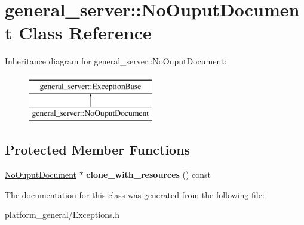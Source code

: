 \hypertarget{classgeneral__server_1_1NoOuputDocument}{\section{general\-\_\-server\-:\-:\-No\-Ouput\-Document \-Class \-Reference}
\label{classgeneral__server_1_1NoOuputDocument}
}
\-Inheritance diagram for general\-\_\-server\-:\-:\-No\-Ouput\-Document\-:\begin{figure}[H]
\begin{center}
\leavevmode
\includegraphics[height=2.000000cm]{classgeneral__server_1_1NoOuputDocument}
\end{center}
\end{figure}
\subsection*{\-Protected \-Member \-Functions}
\begin{DoxyCompactItemize}
\item 
\hypertarget{classgeneral__server_1_1NoOuputDocument_a13090928b4326e08f16f64f52320ebe6}{\hyperlink{classgeneral__server_1_1NoOuputDocument}{\-No\-Ouput\-Document} $\ast$ {\bfseries clone\-\_\-with\-\_\-resources} () const }\label{classgeneral__server_1_1NoOuputDocument_a13090928b4326e08f16f64f52320ebe6}

\end{DoxyCompactItemize}


\-The documentation for this class was generated from the following file\-:\begin{DoxyCompactItemize}
\item 
platform\-\_\-general/\-Exceptions.\-h\end{DoxyCompactItemize}

